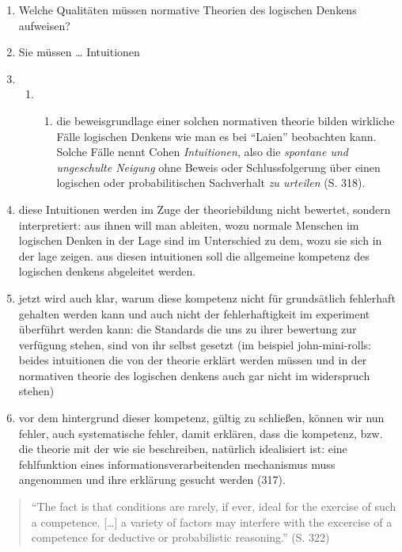 \documentclass[ngerman,12pt, titlepage, smallheadings, nomath]{scrartcl}
\providecommand{\tightlist}{%
  \setlength{\itemsep}{0pt}\setlength{\parskip}{0pt}}
\begin{document}
\begin{enumerate}
\def\labelenumi{\arabic{enumi}.}
\item
  Welche Qualitäten müssen normative Theorien des logischen Denkens
  aufweisen?
\item
  Sie müssen \ldots{} Intuitionen
\item
  \begin{enumerate}
  \def\labelenumii{\alph{enumii}.}
  \setcounter{enumii}{3}
  \item
    \begin{enumerate}
    \def\labelenumiii{\alph{enumiii}.}
    \setcounter{enumiii}{7}
    \tightlist
    \item
      die beweisgrundlage einer solchen normativen theorie bilden
      wirkliche Fälle logischen Denkens wie man es bei \enquote{Laien}
      beobachten kann. Solche Fälle nennt Cohen \emph{Intuitionen}, also
      die \emph{spontane und ungeschulte Neigung} ohne Beweis oder
      Schlussfolgerung über einen logischen oder probabilitischen
      Sachverhalt \emph{zu urteilen} (S. 318).
    \end{enumerate}
  \end{enumerate}
\item
  diese Intuitionen werden im Zuge der theoriebildung nicht bewertet,
  sondern interpretiert: aus ihnen will man ableiten, wozu normale
  Menschen im logischen Denken in der Lage sind im Unterschied zu dem,
  wozu sie sich in der lage zeigen. aus diesen intuitionen soll die
  allgemeine kompetenz des logischen denkens abgeleitet werden.
\item
  jetzt wird auch klar, warum diese kompetenz nicht für grundsätlich
  fehlerhaft gehalten werden kann und auch nicht der fehlerhaftigkeit im
  experiment überführt werden kann: die Standards die uns zu ihrer
  bewertung zur verfügung stehen, sind von ihr selbst gesetzt (im
  beispiel john-mini-rolls: beides intuitionen die von der theorie
  erklärt werden müssen und in der normativen theorie des logischen
  denkens auch gar nicht im widerspruch stehen)
\item
  vor dem hintergrund dieser kompetenz, gültig zu schließen, können wir
  nun fehler, auch systematische fehler, damit erklären, dass die
  kompetenz, bzw. die theorie mit der wie sie beschreiben, natürlich
  idealisiert ist: eine fehlfunktion eines informationsverarbeitenden
  mechanismus muss angenommen und ihre erklärung gesucht werden (317).
\end{enumerate}

\begin{quote}
\enquote{The fact is that conditions are rarely, if ever, ideal for the
exercise of such a competence. {[}\ldots{}{]} a variety of factors may
interfere with the excercise of a competence for deductive or
probabilistic reasoning.} (S. 322)
\end{quote}
\end{document}
